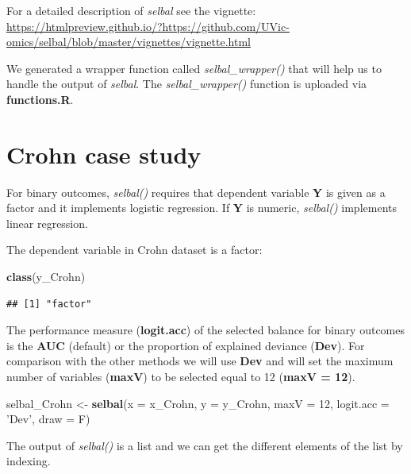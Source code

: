 \documentclass[openany]{book}
\newenvironment{Shaded}{\begin{snugshade}}{\end{snugshade}}
\newcommand{\KeywordTok}[1]{\textcolor[rgb]{0.13,0.29,0.53}{\textbf{#1}}}
\newcommand{\DataTypeTok}[1]{\textcolor[rgb]{0.13,0.29,0.53}{#1}}
\newcommand{\DecValTok}[1]{\textcolor[rgb]{0.00,0.00,0.81}{#1}}
\newcommand{\StringTok}[1]{\textcolor[rgb]{0.31,0.60,0.02}{#1}}
\newcommand{\NormalTok}[1]{#1}
\begin{document}
For a detailed description of \emph{selbal} see the vignette:
\url{https://htmlpreview.github.io/?https://github.com/UVic-omics/selbal/blob/master/vignettes/vignette.html}

We generated a wrapper function called \emph{selbal\_wrapper()} that
will help us to handle the output of \emph{selbal}. The
\emph{selbal\_wrapper()} function is uploaded via \textbf{functions.R}.

\section{Crohn case study}\label{crohn-case-study}

For binary outcomes, \emph{selbal()} requires that dependent variable
\textbf{Y} is given as a factor and it implements logistic regression.
If \textbf{Y} is numeric, \emph{selbal()} implements linear regression.

The dependent variable in Crohn dataset is a factor:

\begin{Shaded}
\begin{Highlighting}[]
\KeywordTok{class}\NormalTok{(y_Crohn)}
\end{Highlighting}
\end{Shaded}

\begin{verbatim}
## [1] "factor"
\end{verbatim}

The performance measure (\textbf{logit.acc}) of the selected balance for
binary outcomes is the \textbf{AUC} (default) or the proportion of
explained deviance (\textbf{Dev}). For comparison with the other methods
we will use \textbf{Dev} and will set the maximum number of variables
(\textbf{maxV}) to be selected equal to 12 (\textbf{maxV = 12}).

\begin{Shaded}
\begin{Highlighting}[]
\NormalTok{selbal_Crohn <-}\StringTok{ }\KeywordTok{selbal}\NormalTok{(}\DataTypeTok{x =}\NormalTok{ x_Crohn, }\DataTypeTok{y =}\NormalTok{ y_Crohn, }\DataTypeTok{maxV =} \DecValTok{12}\NormalTok{, }
                       \DataTypeTok{logit.acc =} \StringTok{'Dev'}\NormalTok{, }\DataTypeTok{draw =}\NormalTok{ F)}
\end{Highlighting}
\end{Shaded}

The output of \emph{selbal()} is a list and we can get the different
elements of the list by indexing.
\end{document}
